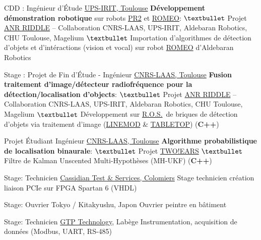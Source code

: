 \documentclass[
	a4paper,
	maincolor=cvgreen,
	sectioncolor=cvgreen,
]{fortysecondscv}
\newcommand{\ros}{\href{http://www.ros.org/}{R.O.S.}}
\begin{document}
\begin{cvtable}[2]
  {CDD : Ingénieur d'Étude}
  {\href{https://www.irit.fr/?lang=fr}{UPS-IRIT, Toulouse}}
  {
    \textbf{Développement démonstration robotique} sur robots
    \href{http://www.willowgarage.com/pages/pr2/overview}{PR2} et
    \href{https://spectrum.ieee.org/automaton/robotics/humanoids/aldebaran-robotics-introduces-romeo-finally}{ROMEO}:\newline
    $\textbullet$ Projet
    \href{http://www.agence-nationale-recherche.fr/Project-ANR-12-CORD-0003}{ANR
      RIDDLE} -- Collaboration CNRS-LAAS, UPS-IRIT, Aldebaran Robotics, CHU
    Toulouse, Magelium\newline
    $\textbullet$ Importation d'algorithmes de détection d'objets et d'intéractions (vision
    et vocal) sur robot \href{https://spectrum.ieee.org/automaton/robotics/humanoids/aldebaran-robotics-introduces-romeo-finally}{ROMEO}
    d'Aldebaran Robotics
  }

  {Stage : Projet de Fin d'Étude - Ingénieur}
  {\href{https://www.laas.fr/public/fr}{CNRS-LAAS, Toulouse}}
  {
    \textbf{Fusion traitement d'image/détecteur radiofréquence pour la
      détection/localisation d'objects}:\newline
    $\textbullet$ Projet
    \href{http://www.agence-nationale-recherche.fr/Project-ANR-12-CORD-0003}{ANR
      RIDDLE} -- Collaboration CNRS-LAAS, UPS-IRIT, Aldebaran Robotics, CHU
    Toulouse, Magelium\newline
    $\textbullet$ Développement sur \ros\ de briques de détection d'objets via
    traitement d'image
    (\href{http://www.stefan-hinterstoisser.com/papers/hinterstoisser2011linemod.pdf}{LINEMOD} 
    \& \href{http://wiki.ros.org/tabletop_object_detector}{TABLETOP}) (\textbf{C++})
  }

  {Projet Étudiant Ingénieur}
  {\href{https://www.laas.fr/public/fr}{CNRS-LAAS, Toulouse}}
  {
    \textbf{Algorithme probabilistique de localisation binaurale}:\newline
    $\textbullet$ Projet \href{http://twoears.eu/}{TWO!EARS}\newline
    $\textbullet$ Filtre de Kalman Unscented Multi-Hypothèses (MH-UKF)
    (\textbf{C++})
  }

  {Stage: Technicien}
  {\href{http://www.spherea.com/fr}{Cassidian Test \& Services, Colomiers}}
  {
    Stage technicien création liaison PCIe sur FPGA Spartan 6 (VHDL)
  }

  {Stage: Ouvrier}
  {Tokyo / Kitakyushu, Japon}
  {
    Ouvrier peintre en bâtiment
  }

  {Stage: Technicien}
  {\href{https://www.gtptech.com/}{GTP Technology}, Labège}
  {
    Instrumentation, acquisition de données (Modbus, UART, RS-485)    
  }
\end{cvtable}



\cvsignature
\end{document}
